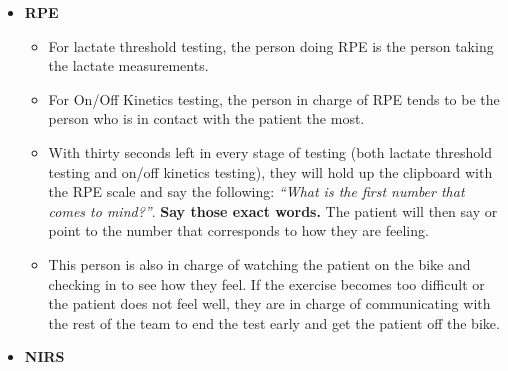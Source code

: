 \documentclass[
]{book}
\providecommand{\tightlist}{%
  \setlength{\itemsep}{0pt}\setlength{\parskip}{0pt}}
\begin{document}
\begin{itemize}
\tightlist
\item
  \textbf{RPE}

  \begin{itemize}
  \tightlist
  \item
    For lactate threshold testing, the person doing RPE is the person taking the lactate measurements.
  \item
    For On/Off Kinetics testing, the person in charge of RPE tends to be the person who is in contact with the patient the most.
  \item
    With thirty seconds left in every stage of testing (both lactate threshold testing and on/off kinetics testing), they will hold up the clipboard with the RPE scale and say the following: \emph{``What is the first number that comes to mind?''}. \textbf{Say those exact words.} The patient will then say or point to the number that corresponds to how they are feeling.
  \item
    This person is also in charge of watching the patient on the bike and checking in to see how they feel. If the exercise becomes too difficult or the patient does not feel well, they are in charge of communicating with the rest of the team to end the test early and get the patient off the bike.
  \end{itemize}
\item
  \textbf{NIRS}


\end{itemize}
\end{document}
